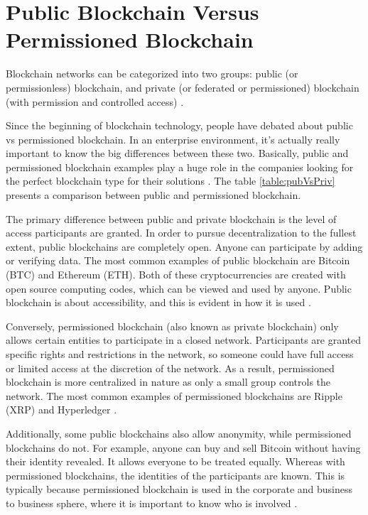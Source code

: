 \section{Public Blockchain Versus Permissioned Blockchain}\label{sec:versus}

Blockchain networks can be categorized into two groups: public (or permissionless) blockchain, and private (or federated or permissioned) blockchain (with permission and controlled access) \cite{greve2018blockchain}.

Since the beginning of blockchain technology, people have debated about public vs permissioned blockchain. In an enterprise environment, it’s actually really important to know the big differences between these two. Basically, public and permissioned blockchain examples play a huge role in the companies looking for the perfect blockchain type for their solutions \cite{101blockchains}. The table \ref{table:pubVsPriv} presents a comparison between public and permissioned blockchain.

The primary difference between public and private blockchain is the level of access participants are granted. In order to pursue decentralization to the fullest extent, public blockchains are completely open. Anyone can participate by adding or verifying data. The most common examples of public blockchain are Bitcoin (BTC) and Ethereum (ETH). Both of these cryptocurrencies are created with open source computing codes, which can be viewed and used by anyone. Public blockchain is about accessibility, and this is evident in how it is used \cite{selfkeyOrg}. 

Conversely, permissioned blockchain (also known as private blockchain) only allows certain entities to participate in a closed network. Participants are granted specific rights and restrictions in the network, so someone could have full access or limited access at the discretion of the network. As a result, permissioned blockchain is more centralized in nature as only a small group controls the network. The most common examples of permissioned blockchains are Ripple (XRP) and Hyperledger \cite{blockgeeks2018deeper}.

Additionally, some public blockchains also allow anonymity, while permissioned blockchains do not. For example, anyone can buy and sell Bitcoin without having their identity revealed. It allows everyone to be treated equally. Whereas with permissioned blockchains, the identities of the participants are known. This is typically because permissioned blockchain is used in the corporate and business to business sphere, where it is important to know who is involved \cite{101blockchains}.

